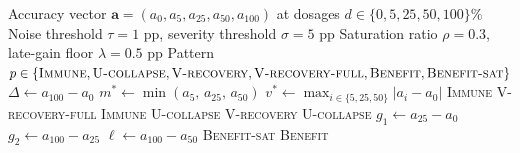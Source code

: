 
\begin{algorithm}[t]
\caption{Dose-Response Profile Classification}
\label{alg:profile-classification}
\begin{algorithmic}[1]
\REQUIRE Accuracy vector $\mathbf{a} = (a_{0}, a_{5}, a_{25}, a_{50}, a_{100})$ at dosages $d \in \{0, 5, 25, 50, 100\}\%$
\REQUIRE Noise threshold $\tau = 1$ pp, severity threshold $\sigma = 5$ pp
\REQUIRE Saturation ratio $\rho = 0.3$, late-gain floor $\lambda = 0.5$ pp
\ENSURE Pattern $p \in \{\textsc{Immune}, \textsc{U-collapse}, \textsc{V-recovery}, \textsc{V-recovery-full}, \textsc{Benefit}, \textsc{Benefit-sat}\}$
\STATE $\Delta \gets a_{100} - a_{0}$ 
\STATE $m^* \gets \min(a_{5},\, a_{25},\, a_{50})$ 
\STATE $v^* \gets \max_{i \in \{5,25,50\}} |a_i - a_0|$ 
\IF{$|\Delta| \le \tau$}
        \RETURN \textsc{Immune} 
        \RETURN \textsc{V-recovery-full} 
    \ELSE
        \RETURN \textsc{Immune} 
    \ENDIF
\ELSIF{$\Delta < -\tau$}
    \IF{$\Delta \le -\sigma$}
        \RETURN \textsc{U-collapse} 
        \RETURN \textsc{V-recovery} 
    \ELSE
        \RETURN \textsc{U-collapse} 
    \ENDIF
\ELSE \COMMENT{$\Delta > \tau$}
    \STATE $g_1 \gets a_{25} - a_{0}$ 
    \STATE $g_2 \gets a_{100} - a_{25}$ 
    \STATE $\ell \gets a_{100} - a_{50}$ 
        \RETURN \textsc{Benefit-sat} 
    \ELSE
        \RETURN \textsc{Benefit} 
    \ENDIF
\ENDIF
\end{algorithmic}
\end{algorithm}
